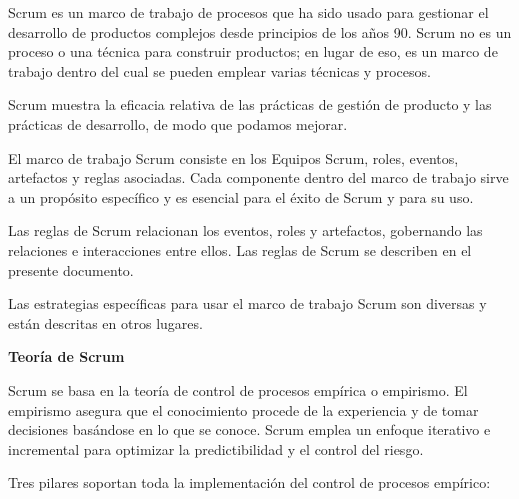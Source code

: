 \documentclass[12pt]{report}%
\begin{document}
Scrum es un marco de trabajo de procesos que ha sido usado para gestionar el desarrollo de productos complejos desde principios de los años 90. Scrum no es un proceso o una técnica para construir productos; en lugar de eso, es un marco de trabajo dentro del cual se pueden emplear varias técnicas y procesos. 

Scrum muestra la eficacia relativa de las prácticas de gestión de producto y las prácticas de desarrollo, de modo que podamos mejorar. 

El marco de trabajo Scrum consiste en los Equipos Scrum, roles, eventos, artefactos y reglas asociadas. Cada componente dentro del marco de trabajo sirve a un propósito específico y es esencial para el éxito de Scrum y para su uso.

Las reglas de Scrum relacionan los eventos, roles y artefactos, gobernando las relaciones e interacciones entre ellos. Las reglas de Scrum se describen en el presente documento.

Las estrategias específicas para usar el marco de trabajo Scrum son diversas y están descritas en otros lugares.

\textbf{ Teoría de Scrum }

Scrum se basa en la teoría de control de procesos empírica o empirismo. El empirismo asegura que el conocimiento procede de la experiencia y de tomar decisiones basándose en lo que se conoce. Scrum emplea un enfoque iterativo e incremental para optimizar la predictibilidad y el control del riesgo. 

Tres pilares soportan toda la implementación del control de procesos empírico: 
\end{document}
